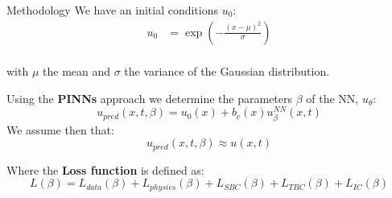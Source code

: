 \begin{frame}{Methodology}
    We have an initial conditions $u_0$:  
    \begin{align*}
        u_0 &= \exp\left(-\frac{(x - \mu)^2}{\sigma}\right)
    \end{align*}
    \\
    with $\mu$ the mean and $\sigma$ the variance of the Gaussian distribution.
    
    \vspace{0.3cm}

    Using the \textbf{PINNs} approach we determine the parameters $\beta$ of the NN, $u_\theta$:
    $$
    u_{pred}(x,t,\beta) = u_0(x) + b_c(x) u_\beta^{NN}(x,t)
    $$
    We assume then that:
    $${u_{pred}}(x,t,\beta)\approx u(x,t)$$ 

    Where the \textbf{Loss function} is defined as:
    $$
    L(\beta) = L_{data}(\beta) + L_{physics}(\beta) + L_{SBC}(\beta) + L_{TBC}(\beta)+ L_{IC}(\beta)
    $$


\end{frame}
